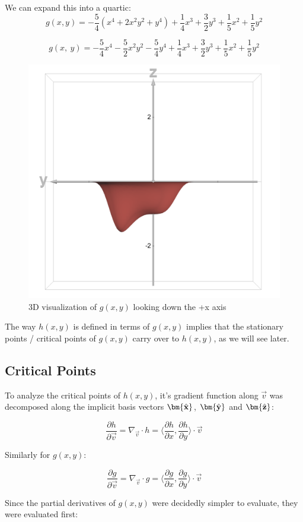 \documentclass{article}
\DeclareRobustCommand{\uvec}[1]{{%
  \ifcsname uvec#1\endcsname
     \csname uvec#1\endcsname
   \else
    \bm{\hat{\mathbf{#1}}}%
   \fi
}}
\begin{document}
We can expand this into a quartic:
\[
g\left(x, y\right)=-\frac{5}{4}\left(x^{4}+2x^{2}y^{2}+y^{4}\right)+\frac{1}{4}x^{3}+\frac{3}{2}y^{3}+\frac{1}{5}x^{2}+\frac{1}{5}y^{2}
\]

\[
g\left(x,\ y\right)=-\frac{5}{4}x^{4}-\frac{5}{2}x^{2}y^{2}-\frac{5}{4}y^{4}+\frac{1}{4}x^{3}+\frac{3}{2}y^{3}+\frac{1}{5}x^{2}+\frac{1}{5}y^{2}
\]

\begin{figure}[h]
    \centering
    \includegraphics[width=0.25\linewidth]{Topography 1.png}
    \caption{3D visualization of $g(x,y)$ looking down the +x axis}
    \label{fig:topography-v1}
\end{figure}


The way $h(x,y)$ is defined in terms of $g(x,y)$ implies that the stationary points / critical points of $g(x,y)$ carry over to $h(x, y)$, as we will see later.

\subsection{Critical Points}

To analyze the critical points of $h(x, y)$, it's gradient function along $\vec{v}$ was decomposed along the implicit basis vectors $\uvec{x}$, $\uvec{y}$ and $\uvec{z}$:

\[
\frac{\partial h}{\partial \vec{v}} = {\nabla}_{\vec{v}} \cdot h = \langle \frac{\partial h}{\partial x}, \frac{\partial h}{\partial y} \rangle \cdot \vec{v}
\]

Similarly for $g(x,y)$:

\[
\frac{\partial g}{\partial \vec{v}} = {\nabla}_{\vec{v}} \cdot g = \langle \frac{\partial g}{\partial x}, \frac{\partial g}{\partial y} \rangle \cdot \vec{v}
\]

Since the partial derivatives of $g(x, y)$ were decidedly simpler to evaluate, they were evaluated first:
\end{document}
